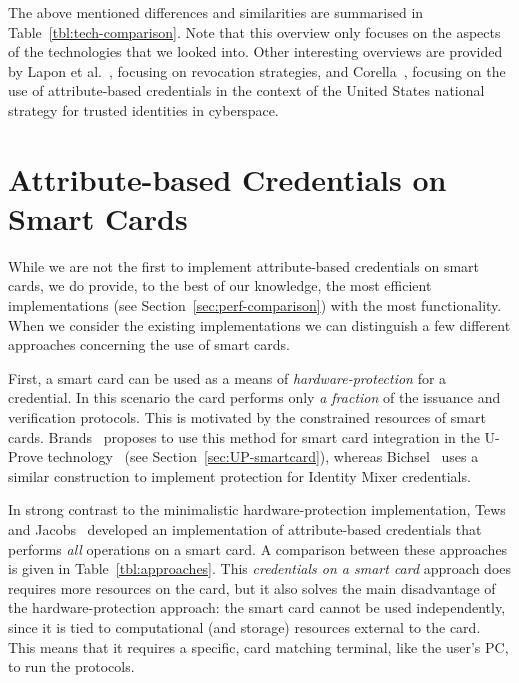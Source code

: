 The above mentioned differences and similarities are summarised in
Table~\ref{tbl:tech-comparison}. Note that this overview only focuses on the
aspects of the technologies that we looked into. Other interesting overviews are
provided by Lapon et al.~\cite{LaponKDN2011,Lapon2012}, focusing on revocation
strategies, and Corella~\cite{Corella2011a,Corella2011b}, focusing on the use
of attribute-based credentials in the context of the United States national
strategy for trusted identities in cyberspace.

\section{Attribute-based Credentials on Smart Cards}

While we are not the first to implement attribute-based credentials on smart
cards, we do provide, to the best of our knowledge, the most efficient
implementations (see Section~\ref{sec:perf-comparison}) with the most
functionality. When we consider the existing implementations we can distinguish
a few different approaches concerning the use of smart cards.

First, a smart card can be used as a means of \emph{hardware-protection} for a
credential. In this scenario the card performs only \emph{a fraction} of the
issuance and verification protocols. This is motivated by the constrained
resources of smart cards. Brands~\cite[Chapter 6]{Brands2000} proposes to use
this method for smart card integration in the U-Prove
technology~\cite{U-Prove_Overview2011} (see Section~\ref{sec:UP-smartcard}),
whereas Bichsel~\cite{Bichsel2007} uses a similar construction to implement
protection for Identity Mixer credentials.

In strong contrast to the minimalistic hardware-protection implementation, Tews
and Jacobs~\cite{TewsJacobs09} developed an implementation of attribute-based
credentials that performs \emph{all} operations on a smart card. A comparison
between these approaches is given in Table~\ref{tbl:approaches}. This
\emph{credentials on a smart card} approach does requires more resources on the
card, but it also solves the main disadvantage of the hardware-protection
approach: the smart card cannot be used independently, since it is tied to
computational (and storage) resources external to the card. This means that it
requires a specific, card matching terminal, like the user's PC, to run
the protocols.

